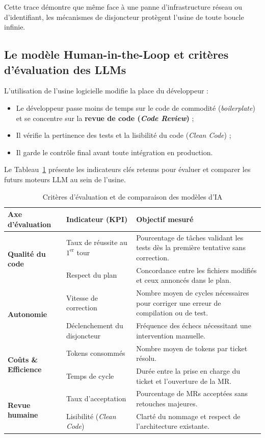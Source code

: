 \documentclass{tnreport}
\begin{document}
Cette trace démontre que même face à une panne d'infrastructure réseau ou d'identifiant, les mécanismes de disjoncteur protègent l'usine de toute boucle infinie.

\subsection{Le modèle Human-in-the-Loop et critères d'évaluation des LLMs}
\label{subsec:role_ingenieur_revue}

L'utilisation de l'usine logicielle modifie la place du développeur :
\begin{itemize}
    \item Le développeur passe moins de temps sur le code de commodité (\textit{boilerplate}) et se concentre sur la \textbf{revue de code (\textit{Code Review})} ;
    \item Il vérifie la pertinence des tests et la lisibilité du code (\textit{Clean Code}) ;
    \item Il garde le contrôle final avant toute intégration en production.
\end{itemize}

Le Tableau~\ref{tab:matrice_benchmarking} présente les indicateurs clés retenus pour évaluer et comparer les futurs moteurs LLM au sein de l'usine.

\begin{table}[htbp]
\centering
\caption{Critères d'évaluation et de comparaison des modèles d'IA}
\label{tab:matrice_benchmarking}
\small
\begin{tabularx}{\textwidth}{|l|l|X|}
\hline
\textbf{Axe d'évaluation} & \textbf{Indicateur (KPI)} & \textbf{Objectif mesuré} \\
\hline
\multirow{2}{*}{\textbf{Qualité du code}} 
& Taux de réussite au $1^{\text{er}}$ tour & Pourcentage de tâches validant les tests dès la première tentative sans correction. \\ \cline{2-3}
& Respect du plan & Concordance entre les fichiers modifiés et ceux annoncés dans le plan. \\
\hline
\multirow{2}{*}{\textbf{Autonomie}} 
& Vitesse de correction & Nombre moyen de cycles nécessaires pour corriger une erreur de compilation ou de test. \\ \cline{2-3}
& Déclenchement du disjoncteur & Fréquence des échecs nécessitant une intervention manuelle. \\
\hline
\multirow{2}{*}{\textbf{Coûts \& Efficience}} 
& Tokens consommés & Nombre moyen de tokens par ticket résolu. \\ \cline{2-3}
& Temps de cycle & Durée entre la prise en charge du ticket et l'ouverture de la MR. \\
\hline
\multirow{2}{*}{\textbf{Revue humaine}} 
& Taux d'acceptation & Pourcentage de MRs acceptées sans retouches majeures. \\ \cline{2-3}
& Lisibilité (\textit{Clean Code}) & Clarté du nommage et respect de l'architecture existante. \\
\hline
\end{tabularx}
\end{table}
\end{document}

